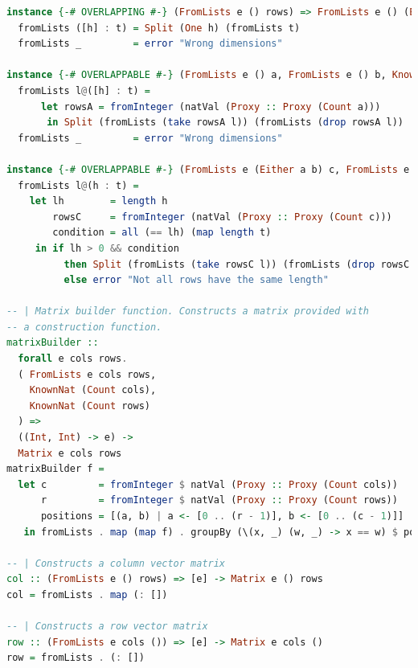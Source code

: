 \documentclass[
  oneside,
  11pt, a4paper,
  footinclude=true,
  headinclude=true,
  cleardoublepage=empty
]{scrbook}
\theoremstyle{definition}
\theoremstyle{definition}
\begin{document}
\begin{lstlisting}[language=Haskell, caption={Type safe inductive matrix library},captionpos=b]
instance {-# OVERLAPPING #-} (FromLists e () rows) => FromLists e () (Either () rows) where
  fromLists ([h] : t) = Split (One h) (fromLists t)
  fromLists _         = error "Wrong dimensions"

instance {-# OVERLAPPABLE #-} (FromLists e () a, FromLists e () b, KnownNat (Count a)) => FromLists e () (Either a b) where
  fromLists l@([h] : t) = 
      let rowsA = fromInteger (natVal (Proxy :: Proxy (Count a)))
       in Split (fromLists (take rowsA l)) (fromLists (drop rowsA l))
  fromLists _         = error "Wrong dimensions"

instance {-# OVERLAPPABLE #-} (FromLists e (Either a b) c, FromLists e (Either a b) d, KnownNat (Count c)) => FromLists e (Either a b) (Either c d) where
  fromLists l@(h : t) =
    let lh        = length h
        rowsC     = fromInteger (natVal (Proxy :: Proxy (Count c)))
        condition = all (== lh) (map length t)
     in if lh > 0 && condition
          then Split (fromLists (take rowsC l)) (fromLists (drop rowsC l))
          else error "Not all rows have the same length"

-- | Matrix builder function. Constructs a matrix provided with
-- a construction function.
matrixBuilder ::
  forall e cols rows.
  ( FromLists e cols rows,
    KnownNat (Count cols),
    KnownNat (Count rows)
  ) =>
  ((Int, Int) -> e) ->
  Matrix e cols rows
matrixBuilder f =
  let c         = fromInteger $ natVal (Proxy :: Proxy (Count cols))
      r         = fromInteger $ natVal (Proxy :: Proxy (Count rows))
      positions = [(a, b) | a <- [0 .. (r - 1)], b <- [0 .. (c - 1)]]
   in fromLists . map (map f) . groupBy (\(x, _) (w, _) -> x == w) $ positions

-- | Constructs a column vector matrix
col :: (FromLists e () rows) => [e] -> Matrix e () rows
col = fromLists . map (: [])

-- | Constructs a row vector matrix
row :: (FromLists e cols ()) => [e] -> Matrix e cols ()
row = fromLists . (: [])


\end{lstlisting}
\end{document}
